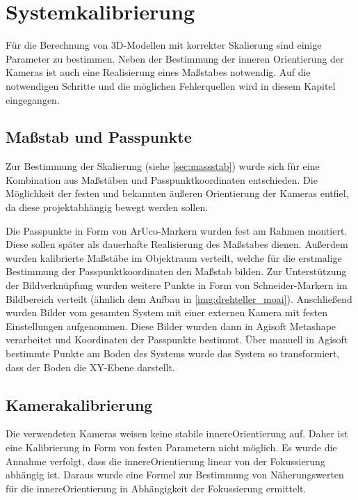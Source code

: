\documentclass[./00PhotoBox.tex]{subfiles}
\begin{document}
\chapter{Systemkalibrierung}
\label{ch:kalibrierung}

Für die Berechnung von 3D-Modellen mit korrekter Skalierung sind einige Parameter zu bestimmen. Neben der Bestimmung der inneren Orientierung der Kameras ist auch eine Realisierung eines Maßstabes notwendig. Auf die notwendigen Schritte und die möglichen Fehlerquellen wird in diesem Kapitel eingegangen.

\section{Maßstab und Passpunkte}
\label{sec:passpunkt_bestimmung}
Zur Bestimmung der Skalierung (siehe \autoref{sec:massstab}) wurde sich für eine Kombination aus Maß\-stäben und Passpunktkoordinaten entschieden. Die Möglichkeit der festen und bekannten äußeren Orientierung der Kameras entfiel, da diese projektabhängig bewegt werden sollen.

Die Passpunkte in Form von ArUco-Markern wurden fest am Rahmen montiert. Diese sollen später als dauerhafte Realisierung des Maßstabes dienen. Außerdem wurden kalibrierte Maßstäbe im Objektraum verteilt, welche für die erstmalige Bestimmung der Passpunktkoordinaten den Maßstab bilden. Zur Unterstützung der Bildverknüpfung wurden weitere Punkte in Form von Schneider-Markern im Bildbereich verteilt (ähnlich dem Aufbau in \autoref{img:drehteller_moai}). Anschließend wurden Bilder vom gesamten System mit  einer externen Kamera mit festen Einstellungen aufgenommen. Diese Bilder wurden dann in Agisoft Metashape verarbeitet und Koordinaten der Passpunkte bestimmt. Über manuell in Agisoft bestimmte Punkte am Boden des Systems wurde das System so transformiert, dass der Boden die XY-Ebene darstellt.

\section{Kamerakalibrierung}
Die verwendeten Kameras weisen keine stabile \gls{innereOrientierung} auf. Daher ist eine Kalibrierung in Form von festen Parametern nicht möglich. Es wurde die Annahme verfolgt, dass die \gls{innereOrientierung} linear von der Fokussierung abhängig ist. Daraus wurde eine Formel zur Bestimmung von Näherungswerten für die \gls{innereOrientierung} in Abhängigkeit der Fokussierung ermittelt.
\end{document}
